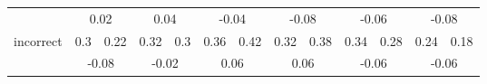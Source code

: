 \begin{table*}[t]
\begin{tabular}{l|llllll|llllll}
                      & \multicolumn{2}{c}{\cellcolor{orange}0.02}  & \multicolumn{2}{c}{\cellcolor{orange}0.04}  & \multicolumn{2}{c|}{\cellcolor{babyblue}-0.04} & \multicolumn{2}{c}{\cellcolor{babyblue}-0.08} & \multicolumn{2}{c}{\cellcolor{babyblue}-0.06} & \multicolumn{2}{c}{\cellcolor{babyblue}-0.08}  \\
\multirow{2}{*}{incorrect}             & 0.3          & 0.22       & 0.32        & 0.3         & 0.36        & 0.42        & 0.32         & 0.38       & 0.34         & 0.28       & 0.24          & 0.18      \\
                      & \multicolumn{2}{c}{\cellcolor{babyblue}-0.08} & \multicolumn{2}{c}{\cellcolor{babyblue}-0.02} & \multicolumn{2}{c|}{\cellcolor{orange}0.06}  & \multicolumn{2}{c}{\cellcolor{orange}0.06}  & \multicolumn{2}{c}{\cellcolor{babyblue}-0.06} & \multicolumn{2}{c}{\cellcolor{babyblue}-0.06} \\
                      \bottomrule
\end{tabular}
\end{table*}
 

